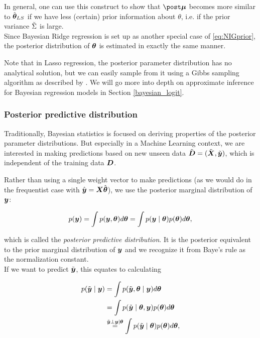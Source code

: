 In general, one can use this construct to show that $\mupo$ becomes more similar to $\hat{\bm{\theta}}_{LS}$ if we have less (certain) prior information about $\theta$, i.e. if the prior variance $\breve{\Sigma}$ is large.\\

Since Bayesian Ridge regression is set up as another special case of \eqref{eq:NIGprior}, the posterior distribution of $\bm{\theta}$ is estimated in exactly the same manner.

Note that in Lasso regression, the posterior parameter distribution has no analytical solution, but we can easily sample from it using a Gibbs sampling algorithm as described by \citet{park_bayesian_2008}.
We will go more into depth on approximate inference for Bayesian regression models in Section \ref{bayesian_logit}.

\subsubsection*{Posterior predictive distribution}
Traditionally, Bayesian statistics is focused on deriving properties of the posterior parameter distributions. But especially in a Machine Learning context, we are interested in making predictions based on new unseen data $\tilde{\bm{D}} = (\tilde{\bm{X}}, \tilde{\bm{y}})$, which is independent of the training data $\bm{D}$.

Rather than using a single weight vector to make predictions (as we would do in the frequentist case with $\hat{\bm{y}} = \bm{X} \hat{\bm{\theta}}$), we use the posterior marginal distribution of $\bm{y}$:

\begin{equation*}
    p(\bm{y}) = \int p(\bm{y}, \bm{\theta}) d\bm{\theta} = \int p(\bm{y} \mid \bm{\theta}) p(\bm{\theta}) d\bm{\theta},
\end{equation*}

which is called the \textit{posterior predictive distribution}. It is the posterior equivalent to the prior marginal distribution of $\bm{y}$ and we recognize it from Baye's rule as the normalization constant.\\

If we want to predict $\tilde{\bm{y}}$, this equates to calculating

\begin{equation*}
    \begin{aligned}
        p(\tilde{\bm{y}} \mid \bm{y}) &= \int p(\tilde{\bm{y}}, \bm{\theta} \mid \bm{y}) d \bm{\theta} \\
        &= \int p(\tilde{\bm{y}} \mid \bm{\theta}, \bm{y}) p(\bm{\theta}) d \bm{\theta} \\
        &\overset{\tilde{\bm{y}} \perp \bm{y} \mid \bm{\theta}}{=}  \int p(\tilde{\bm{y}} \mid \bm{\theta}) p(\bm{\theta}) d \bm{\theta},
    \end{aligned}
\end{equation*}

